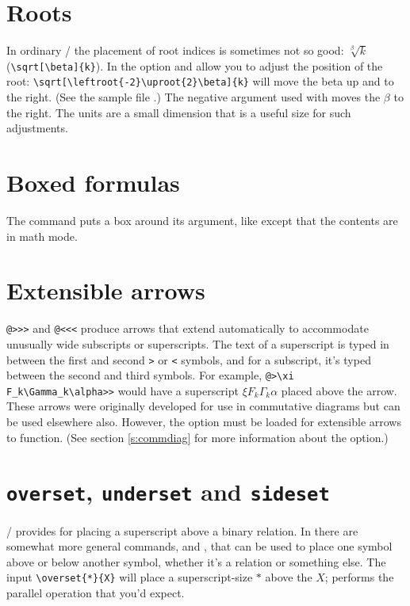 \section{Roots}

In ordinary \latex/ the placement of root indices is sometimes not so
good: $\sqrt[\beta]{k}$ (\verb"\sqrt"\5\verb"[\beta]{k}").  In the
 option  and  allow you to adjust
the position of the root:
\verb"\sqrt"\5\verb"[\leftroot{-2}"\5\verb"\uproot{2}"\5\verb"\beta]{k}"
will move the beta up and to the right.
(See the sample file .) The negative argument
used with  moves the $\beta$ to the right. The units are
a small dimension that is a useful size for such
adjustments.

\section{Boxed formulas} The command  puts a box around its
argument, like  except that the contents are in math mode.

\section{Extensible arrows}  \verb"@>>>" and \verb"@<<<" produce
arrows that extend automatically to accommodate unusually wide
subscripts or superscripts.  The text of a superscript is typed in
between the first and second \verb+>+ or \verb+<+ symbols, and for a
subscript, it's typed between the second and third symbols. For example,
\verb+@>\xi F_k\Gamma_k\alpha>>+ would have a superscript $\xi
F_k\Gamma_k\alpha$ placed above the arrow.   These arrows were
originally developed for use in commutative diagrams but can be used
elsewhere also.  However, the  option must be loaded for extensible
arrows to function.  (See section \ref{s:commdiag} for more information about
the  option.)

\section{{\tt\bslash overset}, {\tt\bslash underset} and
{\tt\bslash sideset}} \latex/ provides  for
placing a superscript above a binary relation.  In 
there are somewhat more general commands,  and
, that can be used to place one symbol above or
below another symbol, whether it's a relation or something
else.  The input \verb"\overset{*}{X}" will place a
superscript-size $*$ above the  $X$;  performs
the parallel operation that you'd expect.

